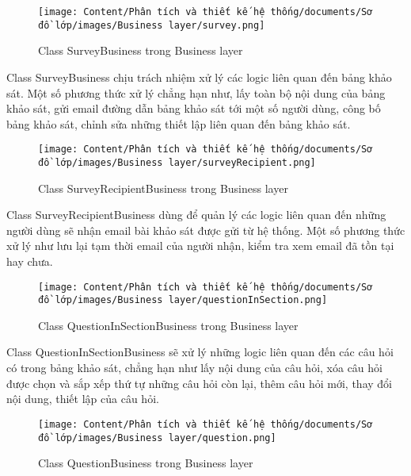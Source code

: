 \begin{figure}[H]
    \centering
    \texttt{[image: Content/Phân tích và thiết kế hệ thống/documents/Sơ đồ lớp/images/Business layer/survey.png]}
    \vspace{0.5cm}
    \caption{Class SurveyBusiness trong Business layer}
    \label{fig:Class SurveyBusiness trong Business layer}
\end{figure}
\par
Class SurveyBusiness chịu trách nhiệm xử lý các logic liên quan đến bảng khảo sát. Một số phương thức xử lý chẳng hạn như, 
lấy toàn bộ nội dung của bảng khảo sát, gửi email đường dẫn bảng khảo sát tới một số người dùng, công bố bảng khảo sát, chỉnh sửa những thiết lập liên quan đến bảng khảo sát.
\begin{figure}[H]
    \centering
    \texttt{[image: Content/Phân tích và thiết kế hệ thống/documents/Sơ đồ lớp/images/Business layer/surveyRecipient.png]}
    \vspace{0.5cm}
    \caption{Class SurveyRecipientBusiness trong Business layer}
    \label{fig:Class SurveyRecipientBusiness trong Business layer}
\end{figure}
\par
Class SurveyRecipientBusiness dùng để quản lý các logic liên quan đến những người dùng sẽ nhận email bài khảo sát được gửi từ hệ thống. 
Một số phương thức xử lý như lưu lại tạm thời email của người nhận, kiểm tra xem email đã tồn tại hay chưa.
\begin{figure}[H]
    \centering
    \texttt{[image: Content/Phân tích và thiết kế hệ thống/documents/Sơ đồ lớp/images/Business layer/questionInSection.png]}
    \vspace{0.5cm}
    \caption{Class QuestionInSectionBusiness trong Business layer}
    \label{fig:Class QuestionInSectionBusiness trong Business layer}
\end{figure}
\par
Class QuestionInSectionBusiness sẽ xử lý những logic liên quan đến các câu hỏi có trong bảng khảo sát, chẳng hạn như lấy nội dung của câu hỏi, 
xóa câu hỏi được chọn và sắp xếp thứ tự những câu hỏi còn lại, thêm câu hỏi mới, thay đổi nội dung, thiết lập của câu hỏi.
\begin{figure}[H]
    \centering
    \texttt{[image: Content/Phân tích và thiết kế hệ thống/documents/Sơ đồ lớp/images/Business layer/question.png]}
    \vspace{0.5cm}
    \caption{Class QuestionBusiness trong Business layer}
    \label{fig:Class QuestionBusiness trong Business layer}
\end{figure}
